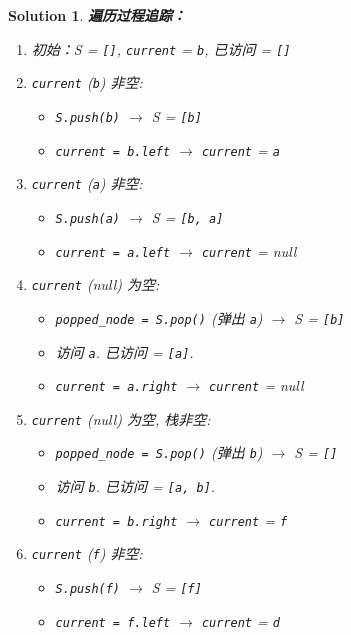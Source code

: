 \documentclass[UTF8]{report}
\newtheorem{solution}{Solution}
\theoremstyle{MyLineTheoremStyle} %
\theoremstyle{MyBlockTheoremStyle} %
\theoremstyle{MySubsubsectionStyle} %
\begin{document}
\begin{solution}
\textbf{遍历过程追踪：}
\begin{enumerate}
    \item 初始：S = \texttt{[]}, \texttt{current} = \texttt{b}, 已访问 = \texttt{[]}
    \item \texttt{current} (\texttt{b}) 非空:
        \begin{itemize}
            \item \texttt{S.push(b)} $\rightarrow$ S = \texttt{[b]}
            \item \texttt{current = b.left} $\rightarrow$ \texttt{current} = \texttt{a}
        \end{itemize}
    \item \texttt{current} (\texttt{a}) 非空:
        \begin{itemize}
            \item \texttt{S.push(a)} $\rightarrow$ S = \texttt{[b, a]}
            \item \texttt{current = a.left} $\rightarrow$ \texttt{current} = null
        \end{itemize}
    \item \texttt{current} (null) 为空:
        \begin{itemize}
            \item \texttt{popped\_node = S.pop()} (弹出 \texttt{a}) $\rightarrow$ S = \texttt{[b]}
            \item 访问 \texttt{a}. 已访问 = \texttt{[a]}.
            \item \texttt{current = a.right} $\rightarrow$ \texttt{current} = null
        \end{itemize}
    \item \texttt{current} (null) 为空, 栈非空:
        \begin{itemize}
            \item \texttt{popped\_node = S.pop()} (弹出 \texttt{b}) $\rightarrow$ S = \texttt{[]}
            \item 访问 \texttt{b}. 已访问 = \texttt{[a, b]}.
            \item \texttt{current = b.right} $\rightarrow$ \texttt{current} = \texttt{f}
        \end{itemize}
    \item \texttt{current} (\texttt{f}) 非空:
        \begin{itemize}
            \item \texttt{S.push(f)} $\rightarrow$ S = \texttt{[f]}
            \item \texttt{current = f.left} $\rightarrow$ \texttt{current} = \texttt{d}

\end{itemize}
\end{enumerate}
\end{solution}
\end{document}

